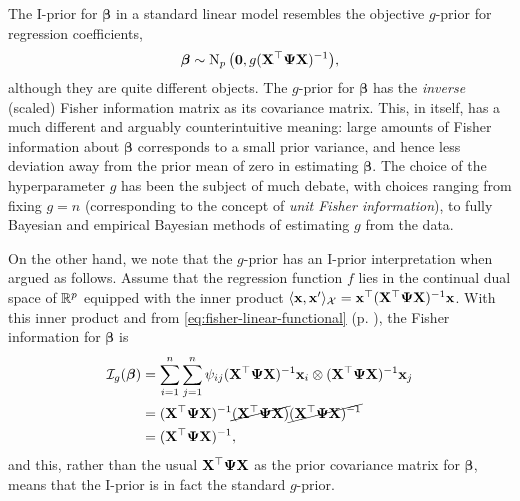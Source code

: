 The I-prior for $\boldsymbol{\beta}$ in a standard linear model resembles the objective $g$-prior \citep{zellner1986assessing} for regression coefficients,
\[
  \boldsymbol{\beta} \sim \operatorname{N}_p\big({\mathbf 0}, g ({\mathbf X}^\top {\bm\Psi} {\mathbf X})^{-1} \big),
\]
although they are quite different objects. 
The $g$-prior for $\boldsymbol{\beta}$ has the \emph{inverse} (scaled) Fisher information matrix as its covariance matrix.
This, in itself, has a much different and arguably counterintuitive meaning: large amounts of Fisher information about $\boldsymbol{\beta}$ corresponds to a small prior variance, and hence less deviation away from the prior mean of zero in estimating $\boldsymbol\beta$.
The choice of the hyperparameter $g$ has been the subject of much debate, with choices ranging from fixing $g=n$ (corresponding to the concept of \emph{unit Fisher information}), to fully Bayesian and empirical Bayesian methods of estimating $g$ from the data.

On the other hand, we note that the $g$-prior has an I-prior interpretation when argued as follows.
Assume that the regression function $f$ lies in the continual dual space of $\mathbb{R}^p$ equipped with the inner product $\langle{\mathbf x},{\mathbf x}'\rangle_{\mathcal X} = {\mathbf x}^\top({\mathbf X}^\top {\bm\Psi} {\mathbf X})^{-1}{\mathbf x}$.
With this inner product and from \cref{eq:fisher-linear-functional} (p. ), the Fisher information for $\boldsymbol{\beta}$ is
\begin{align*}
  {\mathcal I}_g(\boldsymbol\beta) 
  &= \sum_{i=1}^n \sum_{j=1}^n \psi_{ij} ({\mathbf X}^\top {\bm\Psi} {\mathbf X})^{-1}{\mathbf x}_i \otimes ({\mathbf X}^\top {\bm\Psi} {\mathbf X})^{-1}{\mathbf x}_j \\
  &= ({\mathbf X}^\top {\bm\Psi} {\mathbf X})^{-1} \cancel{({\mathbf X}^\top {\bm\Psi} {\mathbf X})} \cancel{({\mathbf X}^\top {\bm\Psi} {\mathbf X})^{-1}} \\
  &= ({\mathbf X}^\top {\bm\Psi} {\mathbf X})^{-1},
\end{align*}
and this, rather than the usual ${\mathbf X}^\top {\bm\Psi} {\mathbf X}$ as the prior covariance matrix for $\boldsymbol{\beta}$, means that the I-prior is in fact the standard $g$-prior.


